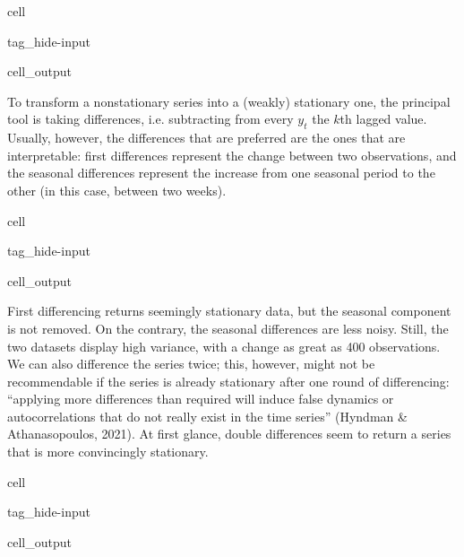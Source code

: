 \documentclass[letterpaper,10pt,english]{jupyterBook}
\begin{document}
\begin{sphinxuseclass}{cell}
\begin{sphinxuseclass}{tag_hide-input}
\begin{sphinxuseclass}{cell_output}
\noindent{}

\end{sphinxuseclass}
\end{sphinxuseclass}
\end{sphinxuseclass}
\sphinxAtStartPar
To transform a non\sphinxhyphen{}stationary series into a (weakly) stationary one, the principal tool is taking differences, i.e. subtracting from every \(y_t\) the \(k\)\sphinxhyphen{}th lagged value. Usually, however, the differences that are preferred are the ones that are interpretable: first differences represent the change between two observations, and the seasonal differences represent the increase from one seasonal period to the other (in this case, between two weeks).

\begin{sphinxuseclass}{cell}
\begin{sphinxuseclass}{tag_hide-input}
\begin{sphinxuseclass}{cell_output}
\noindent{}

\noindent{}

\end{sphinxuseclass}
\end{sphinxuseclass}
\end{sphinxuseclass}
\sphinxAtStartPar
First differencing returns seemingly stationary data, but the seasonal component is not removed. On the contrary, the seasonal differences are less noisy. Still, the two datasets display high variance, with a change as great as 400 observations. We can also difference the series twice; this, however, might not be recommendable if the series is already stationary after one round of differencing: “applying more differences than required will induce false dynamics or autocorrelations that do not really exist in the time series” (Hyndman \& Athanasopoulos, 2021). At first glance, double differences seem to return a series that is more convincingly stationary.

\begin{sphinxuseclass}{cell}
\begin{sphinxuseclass}{tag_hide-input}
\begin{sphinxuseclass}{cell_output}
\noindent{}

\end{sphinxuseclass}
\end{sphinxuseclass}
\end{sphinxuseclass}
\end{document}
